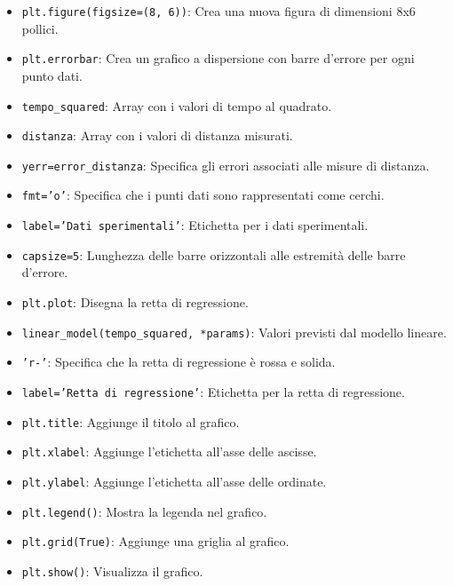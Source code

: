 \documentclass[a4paper,12pt]{article}
\begin{document}
\begin{itemize}
    \item \texttt{plt.figure(figsize=(8, 6))}: Crea una nuova figura di dimensioni 8x6 pollici.
    \item \texttt{plt.errorbar}: Crea un grafico a dispersione con barre d'errore per ogni punto dati.
    \item \texttt{tempo\_squared}: Array con i valori di tempo al quadrato.
    \item \texttt{distanza}: Array con i valori di distanza misurati.
    \item \texttt{yerr=error\_distanza}: Specifica gli errori associati alle misure di distanza.
    \item \texttt{fmt='o'}: Specifica che i punti dati sono rappresentati come cerchi.
    \item \texttt{label='Dati sperimentali'}: Etichetta per i dati sperimentali.
    \item \texttt{capsize=5}: Lunghezza delle barre orizzontali alle estremità delle barre d'errore.
    \item \texttt{plt.plot}: Disegna la retta di regressione.
    \item \texttt{linear\_model(tempo\_squared, *params)}: Valori previsti dal modello lineare.
    \item \texttt{'r-'}: Specifica che la retta di regressione è rossa e solida.
    \item \texttt{label='Retta di regressione'}: Etichetta per la retta di regressione.
    \item \texttt{plt.title}: Aggiunge il titolo al grafico.
    \item \texttt{plt.xlabel}: Aggiunge l'etichetta all'asse delle ascisse.
    \item \texttt{plt.ylabel}: Aggiunge l'etichetta all'asse delle ordinate.
    \item \texttt{plt.legend()}: Mostra la legenda nel grafico.
    \item \texttt{plt.grid(True)}: Aggiunge una griglia al grafico.
    \item \texttt{plt.show()}: Visualizza il grafico.
\end{itemize}
\end{document}
